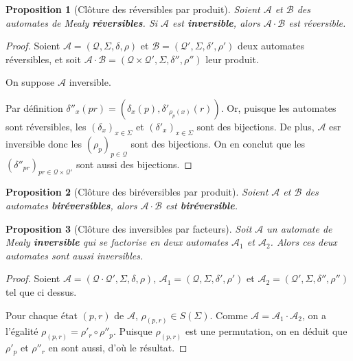\documentclass[11pt,a4paper]{article}
\newtheorem{prop}{Proposition}
\begin{document}
\begin{prop}[Clôture des réversibles par produit]
  Soient $\mathcal{A}$ et $\mathcal{B}$ des automates de Mealy \textbf{réversibles}. Si $\mathcal{A}$ est \textbf{inversible}, alors $\mathcal{A}\cdot\mathcal{B}$ est réversible.
\end{prop}

\begin{proof}
  Soient $\mathcal{A}=\left(\mathcal{Q}, \Sigma, \delta, \rho\right)$ et $\mathcal{B}=\left(\mathcal{Q'}, \Sigma, \delta', \rho'\right)$ deux automates réversibles, et soit $\mathcal{A\cdot B}=\left(\mathcal{Q\times Q'}, \Sigma, \delta'', \rho''\right)$ leur produit.


  On suppose $\mathcal{A}$ inversible.


  Par définition $\delta''_x(pr)=(\delta_x(p), \delta'_{\rho_p(x)}(r))$. Or, puisque les automates sont réversibles, les $(\delta_x)_{x\in\Sigma}$ et ${(\delta'_x)}_{x\in\Sigma}$ sont des bijections. De plus, $\mathcal{A}$ esr inversible donc les ${(\rho_p)}_{p\in \mathcal{Q}}$ sont des bijections. On en conclut que les ${(\delta''_{pr})}_{pr\in\mathcal{Q}\times\mathcal{Q'}}$ sont aussi des bijections.
\end{proof}

\begin{prop}[Clôture des biréversibles par produit]
  Soient $\mathcal{A}$ et $\mathcal{B}$ des automates \textbf{biréversibles}, alors $\mathcal{A}\cdot\mathcal{B}$ est \textbf{biréversible}.
\end{prop}

\begin{prop}[Clôture des inversibles par facteurs]\label{prop_cloture_inv_facteurs}
  Soit $\mathcal{A}$ un automate de Mealy \textbf{inversible} qui se factorise en deux automates $\mathcal{A}_1$ et $\mathcal{A}_2$. Alors ces deux automates sont aussi inversibles.
\end{prop}

\begin{proof}
  Soient $\mathcal{A}=\left(\mathcal{Q\cdot Q'}, \Sigma, \delta, \rho\right)$, $\mathcal{A}_1=\left(\mathcal{Q}, \Sigma, \delta', \rho'\right)$ et $\mathcal{A}_2=\left(\mathcal{Q'}, \Sigma, \delta'', \rho''\right)$ tel que ci dessus.

  Pour chaque état $(p, r)$ de $\mathcal{A}$, $\rho_{(p, r)}\in S(\Sigma)$. Comme $\mathcal{A}=\mathcal{A}_1\cdot\mathcal{A}_2$, on a l'égalité $\rho_{(p, r)}=\rho'_r\circ\rho''_p$. Puisque $\rho_{(p, r)}$ est une permutation, on en déduit que $\rho'_p$ et $\rho''_r$ en sont aussi, d'où le résultat.
\end{proof}
\end{document}
